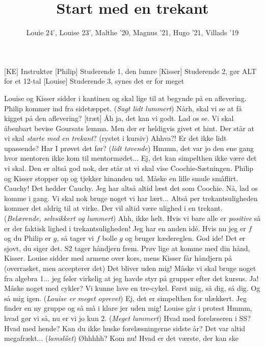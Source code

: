 \documentclass[a4paper,11pt]{article}
\title{Start med en trekant}
\author{Louie 24', Louise 23', Malthe '20, Magnus '21, Hugo '21, Villads '19}
\begin{document}
\maketitle

\begin{roles}
[KE] Instruktør
    [Philip] Studerende 1, den lumre
    [Kisser] Studerende 2, gør ALT for et 12-tal
    [Louise] Studerende 3, synes det er for meget
\end{roles}

\begin{sketch}
\scene Louise og Kisser sidder i kantinen og skal lige til at begynde på en aflevering. Philip kommer ind fra sidetæppet.
 (\textit{Sagt lidt lummert}) Nårh, skal vi se at få kigget på den aflevering?
[træt] Åh ja, det kan vi godt.
 Lad os se. Vi skal åbenbart bevise Goursats lemma. Men der er heldigvis givet et hint.  Der står at vi skal \textit{starte med en trekant}? (rystet i kursiv)
 Ahhva?! Er det ikke lidt upassende? Har I prøvet det før?
 (\textit{lidt tøvende}) Hmmm, det var jo den ene gang hvor mentoren ikke kom til mentormødet...
 Ej, det kan simpelthen ikke være det vi skal. 
 Den er altså god nok, der står at vi skal vise Coochie-Sætningen.
\scene Philip og Kisser stopper op og tjekker hinanden ud. Måske en lille smule småflirt.
 Cauchy! Det hedder Cauchy.
 Jeg har altså altid læst det som Coochie.
 Nå, lad os komme i gang. Vi skal nok bruge noget vi har lært...
 Altså per trekantsuligheden kommer det aldrig til at virke. Der vil altid være ulighed i en trekant.
 (\textit{Belærende, selvsikkert og lummert}) Ahh, ikke helt. Hvis vi bare alle er \textit{positive} så er der faktisk lighed i trekantsuligheden!
 Jeg har en anden idé. Hvis nu jeg er $f$ og du Philip er $g$, så tager vi $f$ bolle $g$ og bruger kædereglen. 
 God ide! Det er sjovt, du siger det.
\scene S2 tager håndjern frem.
 Prøv lige at komme med din hånd, Kisser.
\scene Louise sidder med armene over kors, mens Kisser får håndjern på (overrasket, men accepterer det)
 Det bliver uden mig!
 Måske vi skal bruge noget fra algebra 1... jeg føler virkelig at jeg havde styr på grupper efter det kursus.
 Ja! Måske noget med cykler? Vi kunne lave en tre-cykel. Først mig, så dig, så dig. Og så mig igen.
 (\textit{Louise er meget oprevet}) Ej, det er simpelthen for ulækkert. Jeg finder en ny gruppe og så må i klare jer uden mig!
\scene Louise går i protest
 Hmmm, hvad gør vi så, nu er vi jo kun 2.
 (\textit{Meget lummert}) Hvad med forelæseren i SS?
 Hvad med hende?
 Kan du ikke huske forelæsningerne sidste år? Det var altid megafrækt...
 (\textit{lamslået}) Øhhhhh? 
 Kom nu! Hvad er det værste, der kan ske
\end{sketch}
\end{document}

